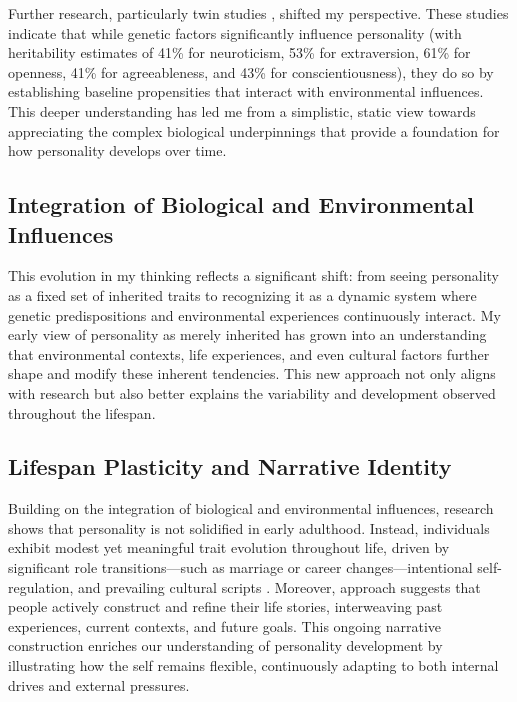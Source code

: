 \documentclass[stu]{apa7}
\begin{document}
Further research, particularly twin studies \parencite{jang1996heritability}, shifted my perspective. These studies indicate that while genetic factors significantly influence personality (with heritability estimates of 41\% for neuroticism, 53\% for extraversion, 61\% for openness, 41\% for agreeableness, and 43\% for conscientiousness), they do so by establishing baseline propensities that interact with environmental influences. This deeper understanding has led me from a simplistic, static view towards appreciating the complex biological underpinnings that provide a foundation for how personality develops over time.

\subsection{Integration of Biological and Environmental Influences}

This evolution in my thinking reflects a significant shift: from seeing personality as a fixed set of inherited traits to recognizing it as a dynamic system where genetic predispositions and environmental experiences continuously interact. My early view of personality as merely inherited has grown into an understanding that environmental contexts, life experiences, and even cultural factors further shape and modify these inherent tendencies. This new approach not only aligns with research but also better explains the variability and development observed throughout the lifespan.

\subsection{Lifespan Plasticity and Narrative Identity}

Building on the integration of biological and environmental influences, research shows that personality is not solidified in early adulthood. Instead, individuals exhibit modest yet meaningful trait evolution throughout life, driven by significant role transitions—such as marriage or career changes—intentional self-regulation, and prevailing cultural scripts \parencite{roberts2006patterns}. Moreover, \textcite{mcadams2001bad} approach suggests that people actively construct and refine their life stories, interweaving past experiences, current contexts, and future goals. This ongoing narrative construction enriches our understanding of personality development by illustrating how the self remains flexible, continuously adapting to both internal drives and external pressures.
\end{document}
